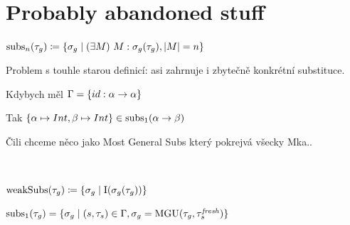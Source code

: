 \documentclass[a4paper,oneside]{memoir}
\begin{document}
~

~

\section{Probably abandoned stuff}

\newcommand{\subs}[2]{\op{subs}_{#2}(#1)}

\begin{preDefinition}
$ \subs{\tau_g}{n} \defi \{ \sigma_g \mid \E{M}{M : \sigma_g(\tau_g)}, \abs{M} = n \}$
\end{preDefinition}

Problem s touhle starou definicí: asi zahrnuje i zbytečně konkrétní substituce.

Kdybych měl $\Gamma = \{id : \alpha \rightarrow \alpha \}$

Tak $\{\alpha \mapsto Int, \beta \mapsto  Int\} \in \subs{\alpha \ar \beta}{1}$

Čili chceme něco jako Most General Subs který pokrejvá všecky Mka.. 



~










$ \operatorname{weakSubs}(\tau_g) \coloneqq \{ \sigma_g \mid \operatorname{I}(\sigma_g(\tau_g)) \}$


\begin{preLemma} 
$ \subs{\tau_g}{1} = \{ \sigma_g \mid (s,\tau_s) \in \Gamma, \sigma_g = \MGU{\tau_g}{\tau^\mathit{fresh}_s}  \} $
\end{preLemma} 




\backmatter
\end{document}
